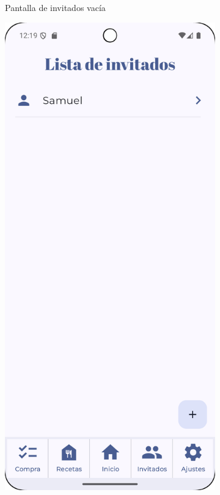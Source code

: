 \begin{figure}[H]
\begin{subfigure}[b]{0.3\textwidth}
      \caption{Pantalla de invitados vacía}
      \label{fig:guest-empty}
    \end{subfigure}
    \hfill
    \begin{subfigure}[b]{0.3\textwidth}
      \includegraphics[width=\textwidth]{./img/manual/guests_not_empty.png}

\end{subfigure}
\end{figure}
